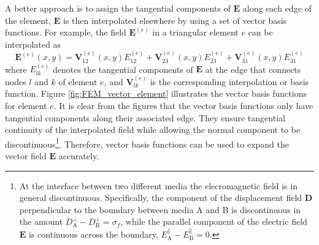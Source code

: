 A better approach is to assign the tangential components of $\mathbf{E}$ along each edge of the element, $\mathbf{E}$ is then interpolated elsewhere by using a set of vector basis functions. For example, the field $\mathbf{E}^{(e)}$ in a triangular element $e$ can be interpolated as \cite{FEM_TheoryAndCompOfEM_Jian-Ming_Jin}
\begin{equation}
    \mathbf{E}^{(e)}(x,y) = \mathbf{V}_{12}^{(e)}(x,y)E_{12}^{(e)} + \mathbf{V}_{23}^{(e)}(x,y)E_{23}^{(e)} + \mathbf{V}_{31}^{(e)}(x,y)E_{31}^{(e)}
\end{equation}
where $E_{lk}^{(e)}$ denotes the tangential components of $\mathbf{E}$ at the edge that connects nodes $l$ and $k$ of element $e$, and $\mathbf{V}_{lk}^{(e)}$ is the corresponding interpolation or basis function. Figure \ref{fig:FEM_vector_element} illustrates the vector basis functions for element $e$. It is clear from the figures that the vector basis functions only have tangential components along their associated edge. They ensure tangential continuity of the interpolated field while allowing the normal component to be discontinuous\footnote{At the interface between two different media the elecromagnetic field is in general discontinuous. Specifically, the component of the displacement field $\mathbf{D}$ perpendicular to the boundary between media A and B is discontinuous in the amount $D_\text{A}^\perp-D_\text{B}^\perp=\sigma_f$, while the parallel component of the electric field $\mathbf{E}$ is continuous across the boundary, $E_\text{A}^\parallel - E_\text{B}^\parallel=0$.\cite{griffiths}}. Therefore, vector basis functions can be used to expand the vector field $\mathbf{E}$ accurately.
